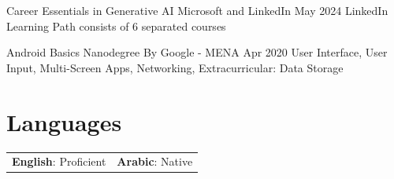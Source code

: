 \documentclass[A4paper, 11pt]{article}
\begin{document}
\project
    {Career Essentials in Generative AI}
    {Microsoft and LinkedIn}
    {May 2024}
    {LinkedIn Learning Path consists of 6 separated courses}

\project
    {Android Basics Nanodegree}
    {By Google - MENA}
    {Apr 2020}
    {User Interface, User Input, Multi-Screen Apps, Networking, Extracurricular: Data Storage}

\section{Languages}

\begin{tabular*}{1.0\textwidth}{p{}p{}}
    \textbf{English}{: Proficient} & \textbf{Arabic}{: Native}
\end{tabular*}
\end{document}
